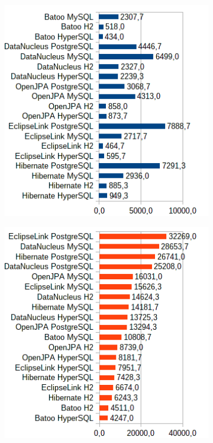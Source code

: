 \begin{figure}[!h]
\begin{subfigure}[b]{1\textwidth}
\includegraphics[width=25em]{obr/bench/jpa13}
\end{subfigure}
\begin{subfigure}[b]{1\textwidth}
\includegraphics[width=25em]{obr/bench/jpa14}
\end{subfigure}
\end{figure}
